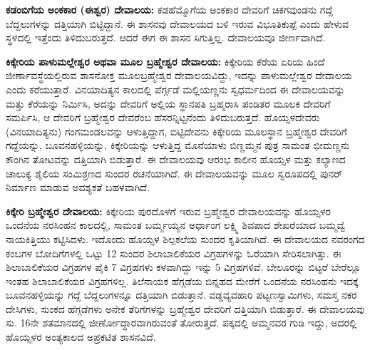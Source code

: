 \textbf{ಕಡಂಬಿಗೆಯ ಅಂಕಕಾರ (ಈಶ್ವರ) ದೇವಾಲಯ:} ಕಡಹೆಮ್ಮೊಗೆಯ ಅಂಕಕಾರ ದೇವರಿಗೆ ಚಿಕಗವುಂಡನು ಗದ್ದೆ ಬೆದ್ದಲುಗಳನ್ನು ದತ್ತಿಯಾಗಿ ಬಿಟ್ಟಿದ್ದಾನೆ. ಈ ಶಾಸನವು ದೇವಾಲಯದ ಬಳಿ ಇರುವ ವಿಭೂತಿಕುಪ್ಪೆ ಎಂದು ಹೇಳುವ ಸ್ಥಳದಲ್ಲಿ ಇತ್ತೆಂದು ತಿಳಿದುಬರುತ್ತದೆ. ಆದರೆ ಈಗ ಈ ಶಾಸನ ಸಿಗುತ್ತಿಲ್ಲ. ದೇವಾಲಯವೂ ಜೀರ್ಣವಾಗಿದೆ.

\textbf{ಕಿಕ್ಕೇರಿಯ ಪಾಳುಮಲ್ಲೇಶ್ವರ ಅಥವಾ ಮೂಲ ಬ್ರಹ್ಮೇಶ್ವರ ದೇವಾಲಯ:} ಕಿಕ್ಕೇರಿಯ ಕೆರೆಯ ಏರಿಯ ಹಿಂದೆ ಜೀರ್ಣಾವಸ್ಥೆಯಲ್ಲಿರುವ ಶಾಸನೋಕ್ತ ಮೂಲಬ್ರಹ್ಮೇಶ್ವರ ದೇವಾಲಯವಿದ್ದು, ಇದನ್ನು ಪಾಳುಮಲ್ಲೇಶ್ವರ ದೇವಾಲಯ ಎಂದು ಕರೆಯುತ್ತಾರೆ. ವಿನಯಾದಿತ್ಯನ ಕಾಲದಲ್ಲಿ ಪೆರ್ಗ್ಗಡೆ ಮಲ್ಲಿಯಣ್ಣನು ಸ್ವಧರ್ಮದಿಂದ ಈ ದೇವಾಲಯವನ್ನು ಮತ್ತು ಕೆರೆಯನ್ನು ನಿರ್ಮಿಸಿ, ಅದನ್ನು ದೇವರಿಗೆ ಅಲ್ಲಿಯ ಸ್ಥಾನಪತಿ ಬ್ರಹ್ಮರಾಸಿ ಪಂಡಿತರ ಮೂಲಕ ದೇವರಿಗೆ ಸಮರ್ಪಿಸಿ, ಆ ದೇವರಿಗೆ ಬ್ರಹ್ಮೇಶ್ವರ ದೇವರೆಂಬ ಹೆಸರನ್ನಿಟ್ಟನೆಂದು ತಿಳಿದುಬರುತ್ತದೆ. ಹೊಯ್ಸಳದೇವರು (ವಿನಯಾದಿತ್ಯನು) ಗಂಗಮಂಡಲವನ್ನು ಆಳುತ್ತಿದ್ದಾಗ, ಬಿಟ್ಟಿದೇವನು ಕಿಕ್ಕೇರಿಯ ಮೂಲಸ್ಥಾನ ಬ್ರಹ್ಮೇಶ್ವರ ದೇವರಿಗೆ ಗದ್ದೆಯನ್ನು, ಬೂವನಹಳ್ಳಿಯನ್ನು, ಕಿಕ್ಕೇರಿಯನ್ನು ಆಳುತ್ತಿದ್ದ ಮೊನೆಯಾಳು ಬಿಣ್ಣಮ್ಮನ ಪುತ್ರ ಸಾಮಂತ ಭೀಮಣ್ಣನು ಕೌಂಗಿನ ತೋಟವನ್ನು ದತ್ತಿಯಾಗಿ ಬಿಡುತ್ತಾರೆ. ಈ ದೇವಾಲಯವು ಆರಂಭ ಕಾಲೀನ ಹೊಯ್ಸಳ ಮತ್ತು ಕಲ್ಯಾಣದ ಚಾಲುಕ್ಯ ಶೈಲಿಯ ಸಂಮಿಶ್ರಣದ ಸುಂದರ ರಚನೆಯಾಗಿದೆ. ಈ ದೇವಾಲಯವನ್ನು ಮೂಲ ಸ್ವರೂಪದಲ್ಲಿ ಪುನರ್‌ ನಿರ್ಮಾಣ ಮಾಡುವ ಅವಶ್ಯಕತೆ ಬಹಳವಾಗಿದೆ.

\textbf{ಕಿಕ್ಕೇರಿ ಬ್ರಹ್ಮೇಶ್ವರ ದೇವಾಲಯ:} ಕಿಕ್ಕೇರಿಯ ಪುರದೊಳಗೆ ಇರುವ ಬ್ರಹ್ಮೇಶ್ವರ ದೇವಾಲಯವನ್ನು ಹೊಯ್ಸಳರ ಒಂದನೆಯ ನರಸಿಂಹನ ಕಾಲದಲ್ಲಿ, ಸಾಮಂತ ಬರ್ಮ್ಮಯ್ಯನ ಅರ್ಧಾಂಗ ಲಕ್ಷ್ಮಿ ಶಿವಪಾದ ಶೇಖರೆಯಾದ ಬಮ್ಮವ್ವೆ ನಾಯಕಿತ್ತಿಯು ಕಟ್ಟಿಸಿದಳು. ಇದೊಂದು ಹೊಯ್ಸಳ ಶಿಲ್ಪಕಲೆಯ ಸುಂದರ ಕೃತಿಯಾಗಿದೆ. ಈ ದೇವಾಲಯದ ನವರಂಗದ ಕಂಬಗಳ ಬೋದಿಗೆಗಳಲ್ಲಿ ಒಟ್ಟು 12 ಸುಂದರ ಶಿಲಾಬಾಲಿಕೆಯರ ವಿಗ್ರಹಗಳನ್ನು ಓರೆಯಾಗಿ ಸೇರಿಸಲಾಗಿತ್ತು. ಈ ಶಿಲಾಬಾಲಿಕೆಯರ ವಿಗ್ರಹಗಳ ಪೈಕಿ 7 ವಿಗ್ರಹಗಳು ಕಳವಾಗಿದ್ದು ಇನ್ನು 5 ವಿಗ್ರಹಗಳಿವೆ. ಬೇಲೂರನ್ನು ಬಿಟ್ಟರೆ ಬೇರೆಲ್ಲೂ ಇಂತಹ ಶಿಲಾಬಾಲಿಕೆಯರ ವಿಗ್ರಹಗಳಿಲ್ಲ. ತಿಲೆನಾಯಕ ಹೆಗ್ಗಡೆಯ ಬಿನ್ನಹದ ಮೇರೆಗೆ ಒಂದನೆಯ ನರಸಿಂಹನು ಇದಕ್ಕೆ ಬೂವನಹಳ್ಳಿಯನ್ನು ಗದ್ದೆ ಬೆದ್ದಲುಗಳನ್ನೂ ದತ್ತಿಯಾಗಿ ಬಿಡುತ್ತಾನೆ. ವಡ್ಡವ್ಯವಹಾರಿ ಪಟ್ಟಣಸ್ವಾಮಿಗಳು, ಸಮಸ್ತ ನಕರ ದೇಸಿಗಳು, ಸುಂಕದ ಹೆಗ್ಗಡೆಗಳು ಅನೇಕ ತೆರಿಗೆಗಳನ್ನು ಬ್ರಹ್ಮೇಶ್ವರ ದೇವರಿಗೆ ದತ್ತಿಯಾಗಿ ಬಿಡುತ್ತಾರೆ. ಈ ದೇವಾಲಯವು ಸು. 16ನೇ ಶತಮಾನದಲ್ಲಿ ಜೀರ್ಣೋದ್ಧಾರವಾಗಿರುವಂತೆ ತೋರುತ್ತದೆ. ಪಕ್ಕದಲ್ಲಿ ಅಮ್ಮನವರ ಗುಡಿ ಇದ್ದು, ಅದರಲ್ಲಿ ಹೊಯ್ಸಳರ ಅಂತ್ಯಕಾಲದ ಅಪ್ರಕಟಿತ ಶಾಸನವಿದೆ.

